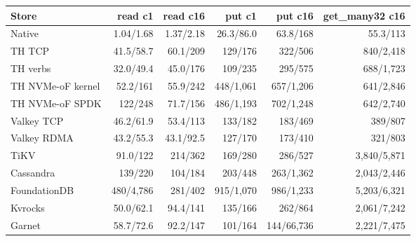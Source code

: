 \small
\begin{tabular}{lrrrrr}\toprule
Store & read c1 & read c16 & put c1 & put c16 & get\_many32 c16\\\midrule
Native & 1.04/1.68 & 1.37/2.18 & 26.3/86.0 & 63.8/168 & 55.3/113\\
TH TCP & 41.5/58.7 & 60.1/209 & 129/176 & 322/506 & 840/2{,}418\\
TH verbs & 32.0/49.4 & 45.0/176 & 109/235 & 295/575 & 688/1{,}723\\
TH NVMe-oF kernel & 52.2/161 & 55.9/242 & 448/1{,}061 & 657/1{,}206 & 641/2{,}846\\
TH NVMe-oF SPDK & 122/248 & 71.7/156 & 486/1{,}193 & 702/1{,}248 & 642/2{,}740\\
Valkey TCP & 46.2/61.9 & 53.4/113 & 133/182 & 183/469 & 389/807\\
Valkey RDMA & 43.2/55.3 & 43.1/92.5 & 127/170 & 173/410 & 321/803\\
TiKV & 91.0/122 & 214/362 & 169/280 & 286/527 & 3{,}840/5{,}871\\
Cassandra & 139/220 & 104/184 & 203/448 & 263/1{,}362 & 2{,}043/2{,}446\\
FoundationDB & 480/4{,}786 & 281/402 & 915/1{,}070 & 986/1{,}233 & 5{,}203/6{,}321\\
Kvrocks & 50.0/62.1 & 94.4/141 & 135/166 & 262/864 & 2{,}061/7{,}242\\
Garnet & 58.7/72.6 & 92.2/147 & 101/164 & 144/66{,}736 & 2{,}221/7{,}475\\
\bottomrule\end{tabular}
